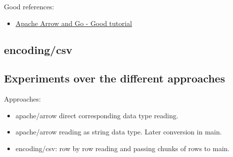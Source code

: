 \documentclass{article}
\begin{document}
Good references:
\begin{itemize}
  \item \href{https://www.apachecon.com/acna2022/slides/01_Topol_Arrow_and_Go.pdf}{Apache Arrow and Go - Good tutorial}
\end{itemize}


\subsection{encoding/csv}

\subsection{Experiments over the different approaches}

Approaches:
\begin{itemize}
  \item apache/arrow direct corresponding data type reading.
  \item apache/arrow reading as string data type. Later conversion in main.
  \item encoding/csv: row by row reading and passing chunks of rows to main.
\end{itemize}



\end{document}
